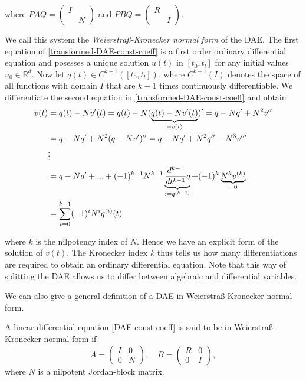 where $PAQ = 
\left( 
\begin{matrix}
	I & \\
	 & N
\end{matrix} 
\right)$
and $PBQ = 
\left( 
\begin{matrix}
	R & \\
	 & I
\end{matrix} 
\right)$.

We call this system the\emph{ Weierstraß-Kronecker normal form} of the DAE. The first equation of \eqref{transformed-DAE-const-coeff} is a first order ordinary differential equation and posesses a unique solution $u(t)$ in $[t_0,t_l]$ for any initial values $u_0 \in \mathbb{R}^d$. Now let $q(t) \in C^{k-1}([t_0,t_l])$, where $C^{k-1}(I)$ denotes the space of all functions with domain $I$ that are $k-1$ times continuously differentiable. We differentiate the second equation in \eqref{transformed-DAE-const-coeff} and obtain
\begin{align}
	\notag
	v(t) &= q(t) - Nv'(t) = q(t) - N(\underbrace{q(t)-Nv'(t)}_{=v(t)})' = q-Nq'+N^2v'' \\ \notag
	&= q-Nq'+N^2(q-Nv')'' = q-Nq'+N^2q''-N^3v''' \\ \notag
	&\vdots \\ \notag
	&= q-Nq'+...+(-1)^{k-1}N^{k-1}\underbrace{\frac{d^{k-1}}{dt^{k-1}}q}_{:=q^{(k-1)}}+(-1)^k \underbrace{N^kv^{(k)}}_{=0}\\ 
	\label{solution-to-transformed-DAE-const-coeff-part2}
	&= \sum_{i=0}^{k-1} (-1)^iN^iq^{(i)}(t)
\end{align}

where $k$ is the nilpotency index of $N$. Hence we have an explicit  form of the solution of $v(t)$. The Kronecker index $k$ thus tells us how many differentiations are required to obtain an ordinary differential equation. Note that this way of splitting the DAE allows us to differ between algebraic and differential variables.

We can also give a general definition of a DAE in Weierstraß-Kronecker normal form.
\newpage
\begin{definition}
	A linear differential equation \eqref{DAE-const-coeff} is said to be in Weierstraß-Kronecker normal form if
	\begin{displaymath}
		A = 
		\left(
		\begin{matrix}
			I & 0 \\
			0 & N
		\end{matrix}
		\right), \quad
		B = 
		\left(
		\begin{matrix}
			R & 0 \\
			0 & I
		\end{matrix}
		\right),
	\end{displaymath}
	where $N$ is a nilpotent Jordan-block matrix.
\end{definition}

